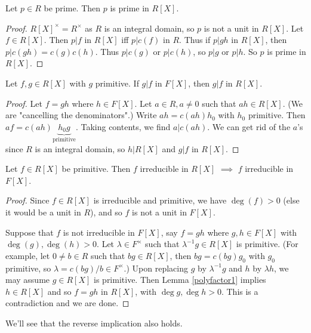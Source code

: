 \documentclass[egregdoesnotlikesansseriftitles,a4paper]{scrartcl}
\begin{document}
\begin{corollary}\label{cor113}
       Let $p \in R$ be prime. Then $p $ is prime in $R[X]$.
       \begin{proof}
              $R[X]^{\times}=R^{\times}$ as $R$ is an integral domain, so $p$ is not a unit in $R[X]$. Let $f \in R[X]$. Then $p |f $ in $R[X]$ iff $p | c (f)$ in $R$. Thus if $p|gh $ in $R[X]$, then $p| c (gh)=c (g)c (h)$. Thus $p | c (g)$ or $p| c (h)$, so $p|g $ or $p|h$. So $p$ is prime in $R[X]$.
       \end{proof}
\end{corollary}
\begin{lemma}\label{polyfactor1}
       Let $f,g \in R[X]$ with $g$ primitive. If $g| f$ in $F[X]$, then $g|f$ in $R[X]$.
       \begin{proof}
              Let $f= gh$ where $h \in F[X]$. Let $a \in R, a \neq 0$ such that $ah \in R[X]$. (We are "cancelling the denominators".) Write $ah =c (ah) h_0 $ with $h_0 $ primitive. Then $af= c (ah)\underbrace{h_0 g}_{\text{primitive}} $. Taking contents, we find $a| c (ah)$. We can get rid of the $a$'s since $R$ is an integral domain, so $h | R[X]$ and $g|f$ in $R[X]$.
       \end{proof}
\end{lemma}
\begin{lemma}
       Let $f \in R[X]$ be primitive. Then $f$ irreducible in $R[X]$ $\implies $ $f$ irreducible in $F[X]$.
       \begin{proof}
              Since $f \in R[X]$ is irreducible and primitive, we have $\operatorname{deg}(f)>0$ (else it would be a unit in $R$), and so $f$ is not a unit in $F[X]$.

              Suppose that $f$ is not irreducible in $F[X]$, say $f=gh$ where $g, h \in F[X]$ with $\operatorname{deg}(g), \operatorname{deg}(h)>0$. Let $\lambda \in F^{\times }$ such that $\lambda^{-1}g \in R[X]$ is primitive. (For example, let $0 \neq b \in R$ such that $bg \in R[X]$, then $bg= c (bg)g_0 $ with $g_0 $ primitive, so $\lambda = c (bg)/b \in F^{\times}$.) Upon replacing $g$ by $\lambda^{-1}g$ and $h$ by $\lambda h$, we may assume $g \in R[X]$ is primitive. Then Lemma \ref{polyfactor1} implies $h \in R[X]$ and so $f=gh$ in $R[X]$, with $\operatorname{deg}g, \operatorname{deg}h>0$. This is a contradiction and we are done.
       \end{proof}
       \begin{remark}
            We'll see that the reverse implication also holds.
     \end{remark}
\end{lemma}
\end{document}
